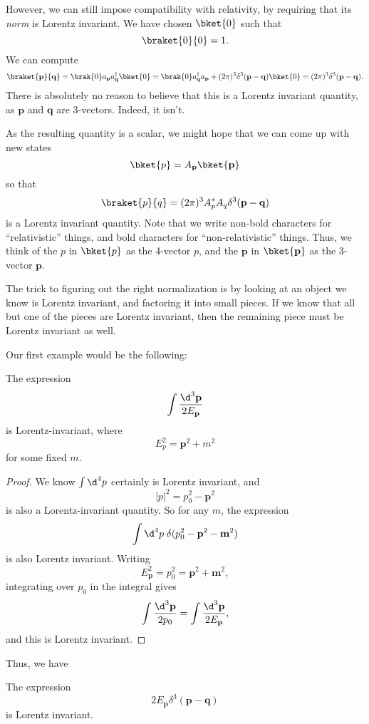\documentclass[a4paper]{article}
\begin{document}
However, we can still impose compatibility with relativity, by requiring that its \emph{norm} is Lorentz invariant. We have chosen $\bket{0}$ such that
\[
  \braket{0}{0} = 1.
\]
We can compute
\[
  \braket{\mathbf{p}}{\mathbf{q}} = \brak{0}a_\mathbf{p} a_\mathbf{q}^\dagger \bket{0} = \brak{0}a_\mathbf{q}^\dagger a_\mathbf{p} + (2\pi)^3 \delta^3(\mathbf{p} - \mathbf{q})\bket{0} = (2\pi)^3 \delta^3(\mathbf{p} - \mathbf{q}).
\]
There is absolutely no reason to believe that this is a Lorentz invariant quantity, as $\mathbf{p}$ and $\mathbf{q}$ are $3$-vectors. Indeed, it isn't.

As the resulting quantity is a scalar, we might hope that we can come up with new states
\[
  \bket{p} = A_\mathbf{p} \bket{\mathbf{p}}
\]
so that
\[
  \braket{p}{q} = (2\pi)^3 A_p^* A_q \delta^3 (\mathbf{p} - \mathbf{q})
\]
is a Lorentz invariant quantity. Note that we write non-bold characters for ``relativistic'' things, and bold characters for ``non-relativistic'' things. Thus, we think of the $p$ in $\bket{p}$ as the 4-vector $p$, and the $\mathbf{p}$ in $\bket{\mathbf{p}}$ as the 3-vector $\mathbf{p}$.

The trick to figuring out the right normalization is by looking at an object we know is Lorentz invariant, and factoring it into small pieces. If we know that all but one of the pieces are Lorentz invariant, then the remaining piece must be Lorentz invariant as well.

Our first example would be the following:
\begin{prop}
  The expression
  \[
    \int \frac{\d^3 \mathbf{p}}{2 E_\mathbf{p}}
  \]
  is Lorentz-invariant, where
  \[
    E_p^2 = \mathbf{p}^2 + m^2
  \]
  for some fixed $m$.
\end{prop}

\begin{proof}
  We know $\int \d^4 p$ certainly is Lorentz invariant, and
  \[
    |p|^2 = p_0^2 - \mathbf{p}^2
  \]
  is also a Lorentz-invariant quantity. So for any $m$, the expression
   \[
    \int \d^4 p\; \delta(p_0^2 - \mathbf{p}^2 - \mathbf{m}^2)
  \]
  is also Lorentz invariant. Writing
  \[
    E_\mathbf{p}^2 = p_0^2 = \mathbf{p}^2 + \mathbf{m}^2,
  \]
  integrating over $p_0$ in the integral gives
  \[
    \int \frac{\d^3 \mathbf{p}}{2p_0} =\int \frac{\d^3 \mathbf{p}}{2 E_\mathbf{p}},
  \]
  and this is Lorentz invariant.
\end{proof}

Thus, we have
\begin{prop}
  The expression
  \[
    2E_\mathbf{p} \delta^3 (\mathbf{p} - \mathbf{q})
  \]
  is Lorentz invariant.
\end{prop}
\end{document}
